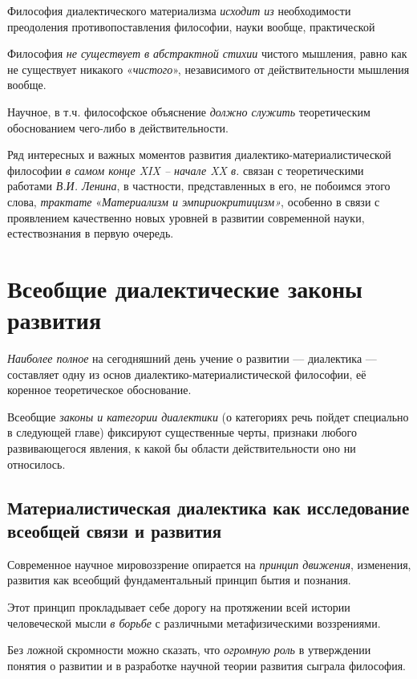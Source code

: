 \documentclass[a4paper,14pt,russian]{extreport}
\begin{document}
Философия диалектического материализма \emph{исходит из} необходимости преодоления противопоставления философии, науки вообще, практической

Философия \emph{не существует в абстрактной стихии} чистого мышления, равно как не существует никакого «\emph{чистого}», независимого от действительности мышления вообще.

Научное, в т.ч. философское объяснение \emph{должно служить} теоретическим обоснованием чего-либо в действительности.

Ряд интересных и важных моментов развития диалектико-материалистической философии \emph{в самом конце XIX -- начале XX в.} связан с теоретическими работами \emph{В.И. Ленина}, в частности, представленных в его, не побоимся этого слова, \emph{трактате} «\emph{Материализм и эмпириокритицизм»}, особенно в связи с проявлением качественно новых уровней в развитии современной науки, естествознания в первую очередь.

\section{Всеобщие диалектические законы развития}

\emph{Наиболее полное} на сегодняшний день учение о развитии --- диалектика --- составляет одну из основ диалектико-материалистической философии, её коренное теоретическое обоснование.

Всеобщие \emph{законы и категории диалектики} (о категориях речь пойдет специально в следующей главе) фиксируют существенные черты, признаки любого развивающегося явления, к какой бы области действительности оно ни относилось.

\subsection{Материалистическая диалектика как исследование всеобщей связи и развития}

Современное научное мировоззрение опирается на \emph{принцип движения}, изменения, развития как всеобщий фундаментальный принцип бытия и познания.

Этот принцип прокладывает себе дорогу на протяжении всей истории человеческой мысли \emph{в борьбе} с различными метафизическими воззрениями.

Без ложной скромности можно сказать, что \emph{огромную роль} в утверждении понятия о развитии и в разработке научной теории развития сыграла философия.
\end{document}
